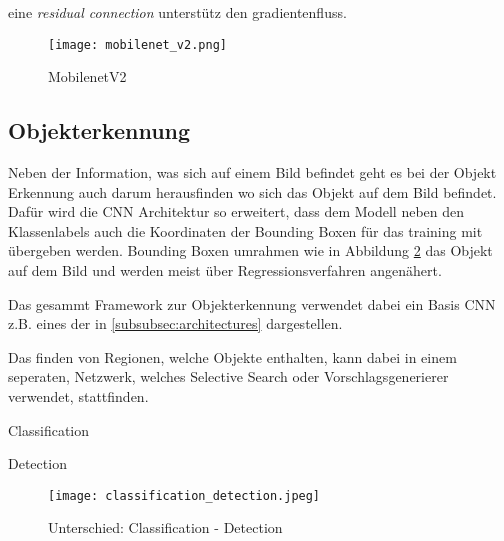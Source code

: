 eine \textit{residual connection} unterstütz den gradientenfluss.

\begin{figure}[H]
    \centering
    \texttt{[image: mobilenet\_v2.png]}
    \caption{MobilenetV2}
    \label{fig:mobilenetv2}
\end{figure}






\subsection{Objekterkennung}\label{subsec:objdet_det}

Neben der Information, was sich auf einem Bild befindet geht 
es bei der Objekt Erkennung auch darum herausfinden wo sich das 
Objekt auf dem Bild befindet.
Dafür wird die CNN Architektur so erweitert, dass dem 
Modell neben den Klassenlabels auch die Koordinaten 
der Bounding Boxen für das training mit übergeben werden.
Bounding Boxen umrahmen wie in Abbildung 
\ref{fig:class_vs_det} das Objekt auf dem Bild und 
werden meist über Regressionsverfahren 
angenähert.

Das gesammt Framework zur Objekterkennung 
verwendet dabei ein Basis CNN z.B. eines der in 
\ref{subsubsec:architectures} dargestellen. 

Das finden von Regionen, welche Objekte enthalten, 
kann dabei in einem seperaten, Netzwerk, welches 
Selective Search oder Vorschlagsgenerierer 
verwendet, stattfinden.



\vspace{1cm}
\begin{minipage}{0.5\textwidth}
    \centering
    Classification
\end{minipage}
\begin{minipage}{0.5\textwidth}
    \centering
    Detection
\end{minipage}
\begin{figure}[H]
    \centering
    \label{fig:class_vs_det}
    \texttt{[image: classification\_detection.jpeg]}
    \caption{Unterschied: Classification - Detection}
\end{figure}




